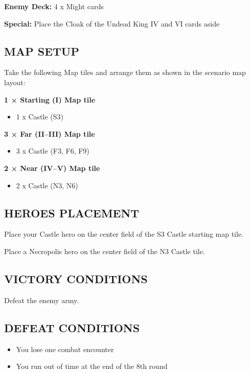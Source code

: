 \begin{multicols*}{2}
\textbf{Enemy Deck:} 4 x Might cards

\textbf{Special:} Place the Cloak of the Undead King IV and VI cards aside

\subsection*{\MakeUppercase{Map setup}}

Take the following Map tiles and arrange them as shown in the scenario map layout:

\textbf{1 × Starting (I) Map tile}
\begin{itemize}
    \item 1 x Castle (S3)
\end{itemize}

\textbf{3 × Far (II--III) Map tile}
\begin{itemize}
    \item 3 x Castle (F3, F6, F9)
\end{itemize}

\textbf{2 × Near (IV--V) Map tile}
\begin{itemize}
    \item 2 x Castle (N3, N6)
\end{itemize}

\subsection*{\MakeUppercase{Heroes placement}}

Place your Castle hero on the center field of the S3 Castle starting map tile.

Place a Necropolis hero on the center field of the N3 Castle tile.

\subsection*{\MakeUppercase{Victory Conditions}}

Defeat the enemy army.

\subsection*{\MakeUppercase{Defeat Conditions}}
\begin{itemize}
  \item You lose one combat encounter
  \item You run out of time at the end of the 8th round
\end{itemize}
\end{multicols*}

